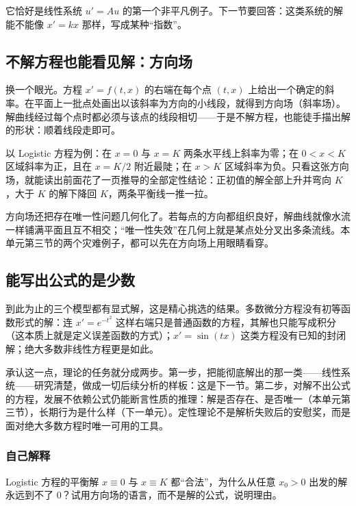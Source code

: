 它恰好是线性系统 \(u'=Au\) 的第一个非平凡例子。下一节要回答：这类系统的解能不能像 \(x'=kx\) 那样，写成某种``指数''。

\subsection{不解方程也能看见解：方向场}

换一个眼光。方程 \(x'=f(t,x)\) 的右端在每个点 \((t,x)\) 上给出一个确定的斜率。在平面上一批点处画出以该斜率为方向的小线段，就得到方向场（斜率场）。解曲线经过每个点时都必须与该点的线段相切——于是不解方程，也能徒手描出解的形状：顺着线段走即可。

以 Logistic 方程为例：在 \(x=0\) 与 \(x=K\) 两条水平线上斜率为零；在 \(0<x<K\) 区域斜率为正，且在 \(x=K/2\) 附近最陡；在 \(x>K\) 区域斜率为负。只看这张方向场，就能读出前面花了一页推导的全部定性结论：正初值的解全部上升并弯向 \(K\)，大于 \(K\) 的解下降回 \(K\)，两条平衡线一推一拉。

方向场还把存在唯一性问题几何化了。若每点的方向都组织良好，解曲线就像水流一样铺满平面且互不相交；``唯一性失效''在几何上就是某点处分叉出多条流线。本单元第三节的两个灾难例子，都可以先在方向场上用眼睛看穿。

\subsection{能写出公式的是少数}

到此为止的三个模型都有显式解，这是精心挑选的结果。多数微分方程没有初等函数形式的解：连 \(x'=e^{-t^2}\) 这样右端只是普通函数的方程，其解也只能写成积分（这本质上就是定义误差函数的方式）；\(x'=\sin(tx)\) 这类方程没有已知的封闭解；绝大多数非线性方程更是如此。

承认这一点，理论的任务就分成两步。第一步，把能彻底解出的那一类——线性系统——研究清楚，做成一切后续分析的样板：这是下一节。第二步，对解不出公式的方程，发展不依赖公式仍能断言性质的推理：解是否存在、是否唯一（本单元第三节），长期行为是什么样（下一单元）。定性理论不是解析失败后的安慰奖，而是面对绝大多数方程时唯一可用的工具。

\subsubsection{自己解释}

Logistic 方程的平衡解 \(x\equiv0\) 与 \(x\equiv K\) 都``合法''，为什么从任意 \(x_0>0\) 出发的解永远到不了 \(0\)？试用方向场的语言，而不是解的公式，说明理由。
